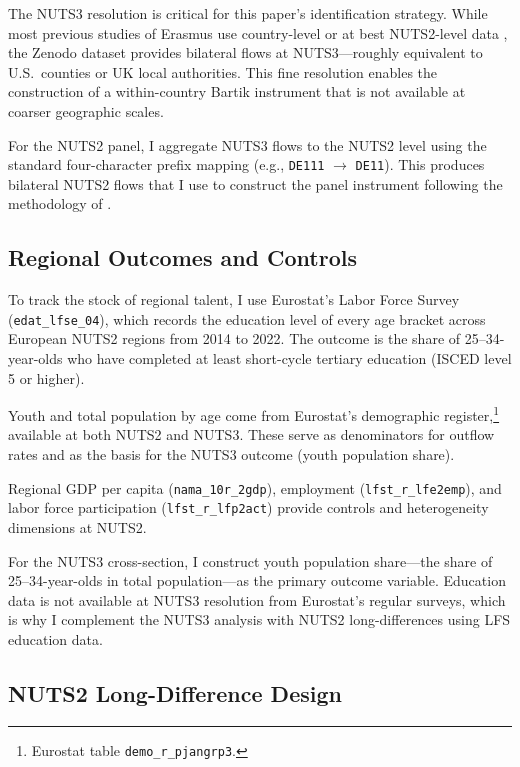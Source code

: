 \documentclass[12pt]{article}
\begin{document}
The NUTS3 resolution is critical for this paper's identification strategy. While most previous studies of Erasmus use country-level or at best NUTS2-level data \citep{de_benedetto_etal_2025, granato_etal_2024}, the Zenodo dataset provides bilateral flows at NUTS3---roughly equivalent to U.S.\ counties or UK local authorities. This fine resolution enables the construction of a within-country Bartik instrument that is not available at coarser geographic scales.

For the NUTS2 panel, I aggregate NUTS3 flows to the NUTS2 level using the standard four-character prefix mapping (e.g., \texttt{DE111} $\to$ \texttt{DE11}). This produces bilateral NUTS2 flows that I use to construct the panel instrument following the methodology of \citet{borusyak_hull_jaravel_2022}.

\subsection{Regional Outcomes and Controls}

To track the stock of regional talent, I use Eurostat's Labor Force Survey (\texttt{edat\_lfse\_04}), which records the education level of every age bracket across European NUTS2 regions from 2014 to 2022. The outcome is the share of 25--34-year-olds who have completed at least short-cycle tertiary education (ISCED level 5 or higher).

Youth and total population by age come from Eurostat's demographic register,\footnote{Eurostat table \texttt{demo\_r\_pjangrp3}.} available at both NUTS2 and NUTS3. These serve as denominators for outflow rates and as the basis for the NUTS3 outcome (youth population share).

Regional GDP per capita (\texttt{nama\_10r\_2gdp}), employment (\texttt{lfst\_r\_lfe2emp}), and labor force participation (\texttt{lfst\_r\_lfp2act}) provide controls and heterogeneity dimensions at NUTS2.

For the NUTS3 cross-section, I construct youth population share---the share of 25--34-year-olds in total population---as the primary outcome variable. Education data is not available at NUTS3 resolution from Eurostat's regular surveys, which is why I complement the NUTS3 analysis with NUTS2 long-differences using LFS education data.

\subsection{NUTS2 Long-Difference Design}
\end{document}
